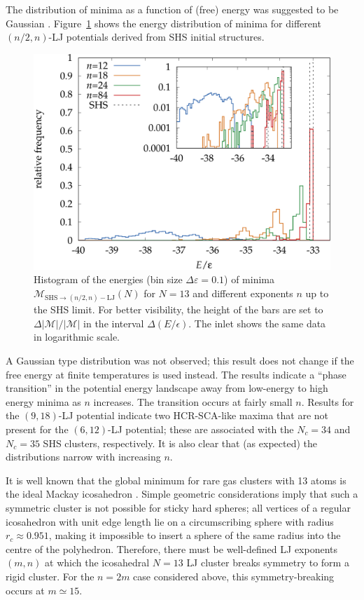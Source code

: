 The distribution of minima as a function of (free) energy was suggested to be
Gaussian \autocite{Sciortino-1999}. Figure~\ref{fig:N13-steps} shows the energy
distribution of minima for different $(n/2,n)$-\ac{LJ} potentials derived from
\ac{SHS} initial structures.
%
\begin{figure}[htb]
    \centering
    \includegraphics[width=0.8\columnwidth]{kslj/N13-steps.pdf}
    \caption{Histogram of the energies (bin size $\Delta\varepsilon=0.1$) of
    minima $\mathcal{M}_{\text{SHS}\to (n/2,n)-\text{LJ}}(N)$ for $N=13$ and
    different exponents $n$ up to the \acs{SHS} limit. For better visibility,
    the height of the bars are set to $\Delta|\mathcal{M}|/|\mathcal{M}|$ in the
    interval $\Delta(E/\epsilon)$. The inlet shows the same data in logarithmic
    scale.}
    \label{fig:N13-steps}
\end{figure}
%
A Gaussian type distribution was not observed; this result does not change if
the free energy at finite temperatures is used instead. The results indicate a
``phase transition'' in the potential energy landscape away from low-energy to
high energy minima as $n$ increases. The transition occurs at fairly small $n$.
Results for the $(9,18)$-\ac{LJ} potential indicate two HCR-SCA-like maxima that are
not present for the $(6,12)$-\ac{LJ} potential; these are associated with the $N_c =
34$ and $N_c = 35$ \ac{SHS} clusters, respectively. It is also clear that (as
expected) the distributions narrow with increasing $n$.

It is well known that the global minimum for rare gas clusters with 13 atoms is
the ideal Mackay icosahedron
\autocite{Hoare_Physicalclustermechanics_1975,Hoare_Statisticalmechanicsmorphology_1976,Hoare_StructureDynamicsSimple_2007}.
Simple geometric considerations imply that such a symmetric cluster is not
possible for sticky hard spheres; all vertices of a regular icosahedron with
unit edge length lie on a circumscribing sphere with radius $r_c\approx 0.951$,
making it impossible to insert a sphere of the same radius into the centre of
the polyhedron. Therefore, there must be well-defined \ac{LJ} exponents $(m,n)$ at
which the icosahedral $N = 13$ \ac{LJ} cluster breaks symmetry to form a rigid
cluster. For the $n = 2m$ case considered above, this symmetry-breaking occurs
at $m \simeq 15$.

